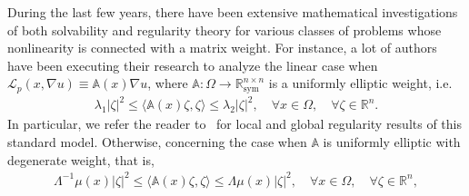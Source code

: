 \documentclass[a4paper, 11pt]{article}
\begin{document}
During the last few years, there have been extensive mathematical investigations of both solvability and regularity theory for various classes of problems whose nonlinearity is connected with a matrix weight. For instance, a lot of authors have been executing their research to analyze the linear case when $\mathcal{L}_p(x,\nabla u) \equiv \mathbb{A}(x)\nabla u$, where $\mathbb{A}: \Omega \rightarrow \mathbb{R}^{n \times n}_{\text{sym}}$ is a uniformly elliptic weight, i.e.
\begin{align}
\label{eq:uniform}
\lambda_1 |\zeta|^2 \le \langle \mathbb{A}(x)\zeta,\zeta \rangle \le \lambda_2 |\zeta|^2, \quad \forall x \in \Omega, \quad \forall \zeta \in \mathbb{R}^n.
\end{align}
In particular, we refer the reader to~\cite{Meyer1963, KZ1999, AQ2002, FFZ2013, BW2004, Byun2005} for local and global regularity results of this standard model. Otherwise, concerning the case when $\mathbb{A}$ is uniformly elliptic with degenerate weight, that is,
\begin{align}
\label{eq:degenerate}
\Lambda^{-1} \mu(x)|\zeta|^2 \le \langle \mathbb{A}(x) \zeta, \zeta \rangle \le \Lambda \mu(x)|\zeta|^2, \quad \forall x \in \Omega, \quad \forall \zeta \in \mathbb{R}^n,
\end{align}
\end{document}
